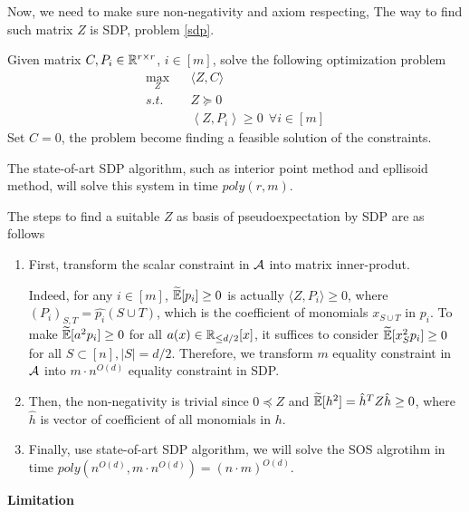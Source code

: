 Now, we need to make sure non-negativity and axiom respecting, The way to find such matrix $Z$ is SDP, problem \ref{sdp}.
\begin{prob}
    \label{sdp}
    Given matrix $C, P_i\in\mathbb{R}^{r\times r}$, $i\in[m]$, solve the following optimization problem
    \begin{equation}
    \begin{split}
        \max_Z~~~~&\langle Z,C\rangle \\
        s.t.~~~~ &Z \succeq 0\\
        &\left\langle Z, P_i\right\rangle\ge 0~~\forall i\in[m]
    \end{split}
    \end{equation}
    Set $C=0$, the problem become finding a feasible solution of the constraints.
\end{prob}
The state-of-art SDP algorithm, such as interior point method and epllisoid method, will solve this system in time $poly(r,m)$.

The steps to find a suitable $Z$ as basis of pseudoexpectation by SDP are as follows
\begin{enumerate}
    \item First, transform the scalar constraint in $\mathcal{A}$ into matrix inner-produt.
    
    Indeed, for any $i\in[m]$, $\widetilde{\mathbb{E}}[p_i]\ge 0$ is actually $\langle Z, P_i \rangle \ge 0$, where $(P_i)_{S,T} = \hat{p_i}(S\cup T)$, which is the coefficient of monomials $x_{S\cup T}$ in $p_i$. To make $\widetilde{\mathbb{E}}[a^2 p_i]\ge0$ for all $a(x)\in\mathbb{R}_{\le d/2}[x]$, it suffices to consider $\widetilde{\mathbb{E}}[x_S^2 p_i]\ge 0$ for all $S\subset[n],|S|=d/2$. Therefore, we transform $m$ equality constraint in $\mathcal{A}$ into $m\cdot n^{O(d)}$ equality constraint in SDP.

    \item Then, the non-negativity is trivial since $0\preccurlyeq Z$ and $\widetilde{\mathbb{E}}[h^2]= \hat{h}^T Z \hat{h}\ge 0$, where $\hat{h}$ is vector of coefficient of all monomials in $h$. 
    
    \item Finally, use state-of-art SDP algorithm, we will solve the SOS algrotihm in time $poly(n^{O(d)}, m\cdot n^{O(d)}) = (n\cdot m)^{O(d)}$.
\end{enumerate}


\bigskip

\textbf{Limitation}


